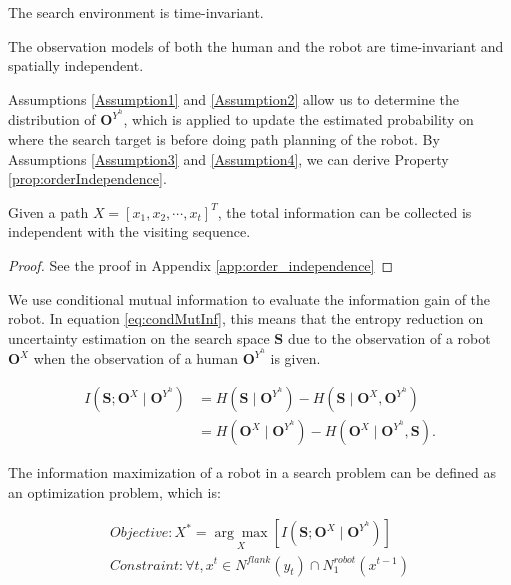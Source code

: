 \begin{Hyp}
\label{Assumption3}
The search environment is time-invariant.
\end{Hyp}

\begin{Hyp}
\label{Assumption4}
The observation models of both the human and the robot are time-invariant and spatially independent.
\end{Hyp}

Assumptions \ref{Assumption1} and \ref{Assumption2} allow us to determine the distribution of $ \mathbf{O}^{Y^{h}} $, which is applied to update the estimated probability on where the search target is before doing path planning of the robot.
By Assumptions \ref{Assumption3} and \ref{Assumption4}, we can derive Property \ref{prop:orderIndependence}.

\begin{propty}
\label{prop:orderIndependence}
Given a path $ X = [ x_{1}, x_{2} , \cdots , x_{t} ]^{T} $, the total information can be collected is independent with the visiting sequence.
\begin{proof}
See the proof in Appendix \ref{app:order_independence}
\end{proof}
\end{propty}


We use conditional mutual information to evaluate the information gain of the robot.
In equation \eqref{eq:condMutInf}, this means that the entropy reduction on uncertainty estimation on the search space $ \mathbf{S} $ due to the observation of a robot $ \mathbf{O}^{X} $ when the observation of a human $ \mathbf{O}^{Y^{h}} $ is given.

\begin{equation}
\label{eq:condMutInf}
\begin{aligned}
I(\mathbf{S}; \mathbf{O}^{X} \mid \mathbf{O}^{Y^{h}}) & = H(\mathbf{S} \mid \mathbf{O}^{Y^{h}}) - H(\mathbf{S} \mid \mathbf{O}^{X},\mathbf{O}^{Y^{h}})\\
& = H(\mathbf{O}^{X} \mid \mathbf{O}^{Y^{h}}) - H(\mathbf{O}^{X} \mid \mathbf{O}^{Y^{h}}, \mathbf{S}).
\end{aligned}
\end{equation}

The information maximization of a robot in a search problem can be defined as an optimization problem, which is:

\begin{equation}
\label{eq:objFunc}
\begin{aligned}
Objective: X^{*} = \underset{X}{\arg\max} [I(\mathbf{S}; \mathbf{O}^{X} \mid \mathbf{O}^{Y^{h}})] \\
Constraint: \forall t, x^{t} \in N^{flank}(y_{t}) \cap N^{robot}_{1}(x^{t-1}) 
\end{aligned}
\end{equation}

